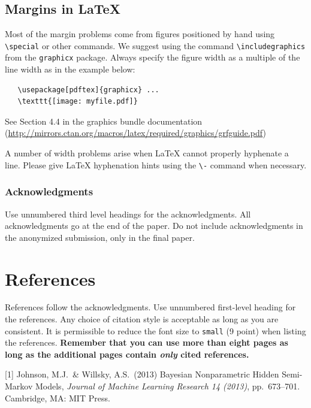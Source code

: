 \documentclass{article}
\begin{document}
\subsection{Margins in \LaTeX{}}

Most of the margin problems come from figures positioned by hand using
\verb+\special+ or other commands. We suggest using the command
\verb+\includegraphics+ from the \verb+graphicx+ package. Always specify the
figure width as a multiple of the line width as in the example below:
\begin{verbatim}
   \usepackage[pdftex]{graphicx} ...
   \texttt{[image: myfile.pdf]}
\end{verbatim}
See Section 4.4 in the graphics bundle documentation
(\url{http://mirrors.ctan.org/macros/latex/required/graphics/grfguide.pdf})

A number of width problems arise when \LaTeX{} cannot properly hyphenate a
line. Please give LaTeX hyphenation hints using the \verb+\-+ command when
necessary.

\subsubsection*{Acknowledgments}

Use unnumbered third level headings for the acknowledgments. All acknowledgments
go at the end of the paper. Do not include acknowledgments in the anonymized
submission, only in the final paper.

\section*{References}

References follow the acknowledgments. Use unnumbered first-level heading for
the references. Any choice of citation style is acceptable as long as you are
consistent. It is permissible to reduce the font size to \verb+small+ (9 point)
when listing the references. {\bf Remember that you can use more than eight
  pages as long as the additional pages contain \emph{only} cited references.}
\medskip

\small

[1] Johnson, M.J.\ \& Willsky, A.S.\ (2013) Bayesian Nonparametric Hidden Semi-Markov Models, {\it Journal of Machine Learning Research 14 (2013)},
pp.\ 673--701. Cambridge, MA: MIT Press.
\end{document}
